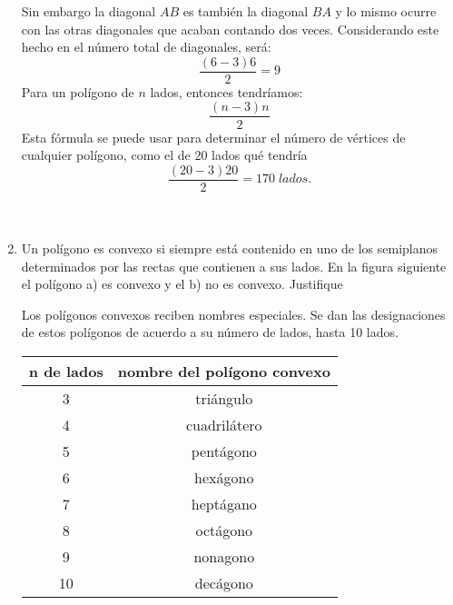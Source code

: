 \begin{enumerate}
	\begin{center}
	\end{center}
	    Sin embargo la diagonal $AB$ es también la diagonal $BA$ y lo mismo ocurre con las otras diagonales que acaban contando dos veces. Considerando este hecho en el número total de diagonales, será: $$\dfrac{(6 - 3) 6}{2} = 9$$ Para un polígono de $n$ lados, entonces tendríamos: $$\dfrac{(n - 3)n}{2}$$ Esta fórmula se puede usar para determinar el número de vértices de cualquier polígono, como el de $20$ lados qué tendría $$\dfrac{(20 - 3) 20}{2} = 170 \; lados.$$\\\\

	\item Un polígono es convexo si siempre está contenido en uno de los semiplanos determinados por las rectas que contienen a sus lados. En la figura siguiente el polígono a) es convexo y el b) no es convexo. Justifique

	    \begin{multicols}{2}
		\begin{center}
		    
		\end{center}
	    \end{multicols}
	    Los polígonos convexos reciben nombres especiales. Se dan las designaciones de estos polígonos de acuerdo a su número de lados, hasta 10 lados.
	    \begin{center}
		\begin{tabular}{cc}
		    n de lados  &  nombre del polígono convexo\\
		    \hline
		     3 & triángulo \\
		     4 & cuadrilátero\\
		     5 & pentágono\\
		     6 & hexágono\\
		     7 & heptágano\\
		     8 & octágono\\
		     9 & nonagono\\
		     10& decágono\\
		\end{tabular}
	    \end{center}
	    

\end{enumerate}
